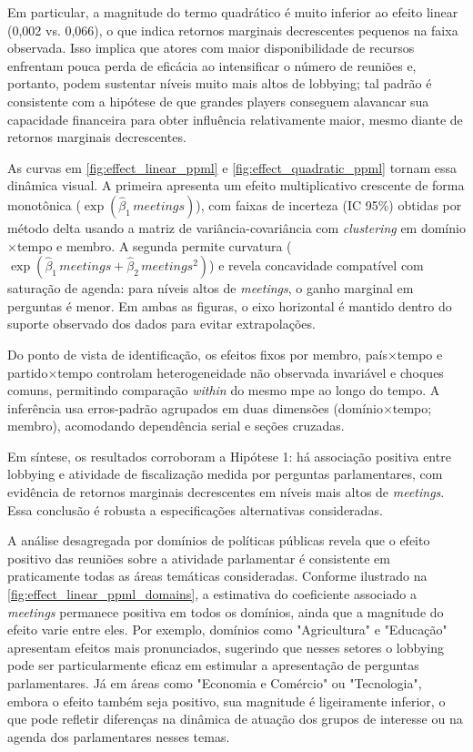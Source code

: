 Em particular, a magnitude do termo quadrático é muito inferior ao efeito linear (0,002 vs. 0,066), o que indica retornos marginais decrescentes pequenos na faixa observada. Isso implica que atores com maior disponibilidade de recursos enfrentam pouca perda de eficácia ao intensificar o número de reuniões e, portanto, podem sustentar níveis muito mais altos de lobbying; tal padrão é consistente com a hipótese de que grandes players conseguem alavancar sua capacidade financeira para obter influência relativamente maior, mesmo diante de retornos marginais decrescentes.

As curvas em \autoref{fig:effect_linear_ppml} e \autoref{fig:effect_quadratic_ppml} tornam essa dinâmica visual. A primeira apresenta um efeito multiplicativo crescente de forma monotônica (\(\exp(\hat{\beta}_1\,\allowbreak\textit{meetings})\)), com faixas de incerteza (IC 95\%) obtidas por método delta usando a matriz de variância-covariância com \textit{clustering} em domínio$\times$tempo e membro. A segunda permite curvatura (\(\exp(\hat{\beta}_1\,\allowbreak\textit{meetings}+\hat{\beta}_2\,\allowbreak\textit{meetings}^2)\)) e revela concavidade compatível com saturação de agenda: para níveis altos de \textit{meetings}, o ganho marginal em perguntas é menor. Em ambas as figuras, o eixo horizontal é mantido dentro do suporte observado dos dados para evitar extrapolações.

Do ponto de vista de identificação, os efeitos fixos por membro, país$\times$tempo e partido$\times$tempo controlam heterogeneidade não observada invariável e choques comuns, permitindo comparação \textit{within} do mesmo \acrshort{mpe} ao longo do tempo. A inferência usa erros-padrão agrupados em duas dimensões (domínio$\times$tempo; membro), acomodando dependência serial e seções cruzadas.

Em síntese, os resultados corroboram a Hipótese 1: há associação positiva entre lobbying e atividade de fiscalização medida por perguntas parlamentares, com evidência de retornos marginais decrescentes em níveis mais altos de \textit{meetings}. Essa conclusão é robusta a especificações alternativas consideradas.

A análise desagregada por domínios de políticas públicas revela que o efeito positivo das reuniões sobre a atividade parlamentar é consistente em praticamente todas as áreas temáticas consideradas. Conforme ilustrado na \autoref{fig:effect_linear_ppml_domains}, a estimativa do coeficiente associado a \textit{meetings} permanece positiva em todos os domínios, ainda que a magnitude do efeito varie entre eles. Por exemplo, domínios como "Agricultura" e "Educação" apresentam efeitos mais pronunciados, sugerindo que nesses setores o lobbying pode ser particularmente eficaz em estimular a apresentação de perguntas parlamentares. Já em áreas como "Economia e Comércio" ou "Tecnologia", embora o efeito também seja positivo, sua magnitude é ligeiramente inferior, o que pode refletir diferenças na dinâmica de atuação dos grupos de interesse ou na agenda dos parlamentares nesses temas.

